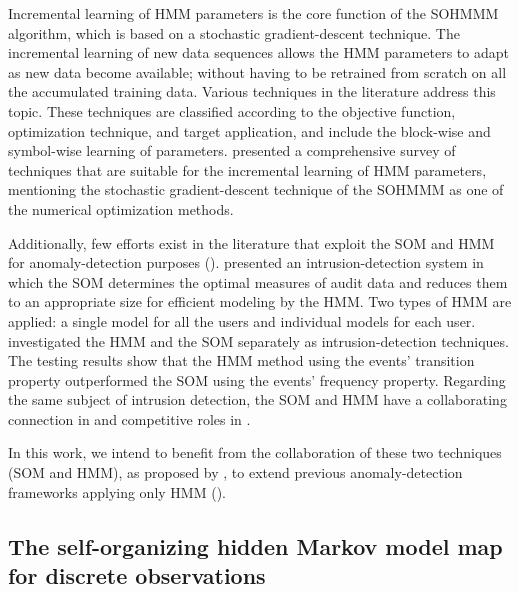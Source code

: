 Incremental learning of HMM parameters is the core function of the SOHMMM algorithm, which is based on a stochastic gradient-descent technique. The incremental learning of new data sequences allows the HMM parameters to adapt as new data become available; without having to be retrained from scratch on all the accumulated training data. Various techniques in the literature address this topic. These techniques are classified according to the objective function, optimization technique, and target application, and include the block-wise and symbol-wise learning of parameters. \citet{Khreich2012} presented a comprehensive survey of techniques that are suitable for the incremental learning of HMM parameters, mentioning the stochastic gradient-descent technique of the SOHMMM as one of the numerical optimization methods.

Additionally, few efforts exist in the literature that exploit the SOM and HMM for anomaly-detection purposes (\citet{Cho2002,Wang2006}). \citet{Cho2002} presented an intrusion-detection system in which the SOM determines the optimal measures of audit data and reduces them to an appropriate size for efficient modeling by the HMM. Two types of HMM are applied: a single model for all the users and individual models for each user. \citet{Wang2006} investigated the HMM and the SOM separately as intrusion-detection techniques. The testing results show that the HMM method using the events' transition property outperformed the SOM using the events' frequency property. Regarding the same subject of intrusion detection, the SOM and HMM have a collaborating connection in \cite{Cho2002} and competitive roles in \cite{Wang2006}.

In this work, we intend to benefit from the collaboration of these two techniques (SOM and HMM), as proposed by \citet{Ferles2008}, to extend previous anomaly-detection frameworks applying only HMM (\citet{Anisa2014,Anisa2017,Anisa2019}).

\subsection{The self-organizing hidden Markov model map for discrete observations}
\label{sec:sohmmm_background}

